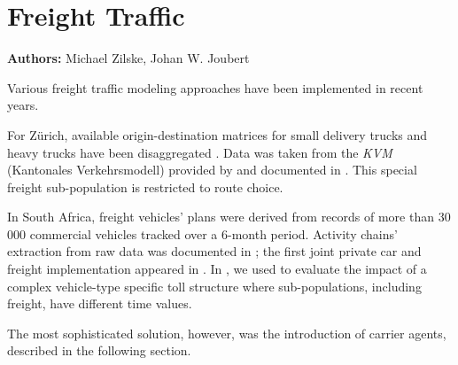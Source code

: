 \chapter{Freight Traffic}
\label{ch:freight}

\hfill \textbf{Authors:} Michael Zilske, Johan W. Joubert




Various  freight traffic modeling approaches have been implemented in recent years. 

For Zürich, available origin-destination matrices for small delivery trucks and heavy trucks have been disaggregated \citet[][]{ShahM_TechRep_IVT_2010}. Data was taken from the \emph{KVM} (Kantonales Verkehrsmodell) provided by \citet{AMV_Webpage_2011} and documented in \citet[][]{GottardiBuergler_SV_1999}. This special freight sub-population is restricted to route choice.

In South Africa, freight vehicles' plans were derived from  records of more than 30\,000 commercial vehicles tracked over a 6-month period.  Activity chains' extraction from raw  data was documented in \citet[][]{JoubertAxhausen_JTG_2011}; the first joint private car and freight implementation appeared in \citet[][]{JoubertJEtAl_TRR_2010}. In \citet[][]{NagelKickhoeferJoubert2014HeterogeneousVoTsPROCEDIA}, we used  to evaluate the impact of a complex vehicle-type specific toll structure where sub-populations, including freight, have different time values.

The most sophisticated solution, however, was the introduction of carrier agents, described in the following section. 


